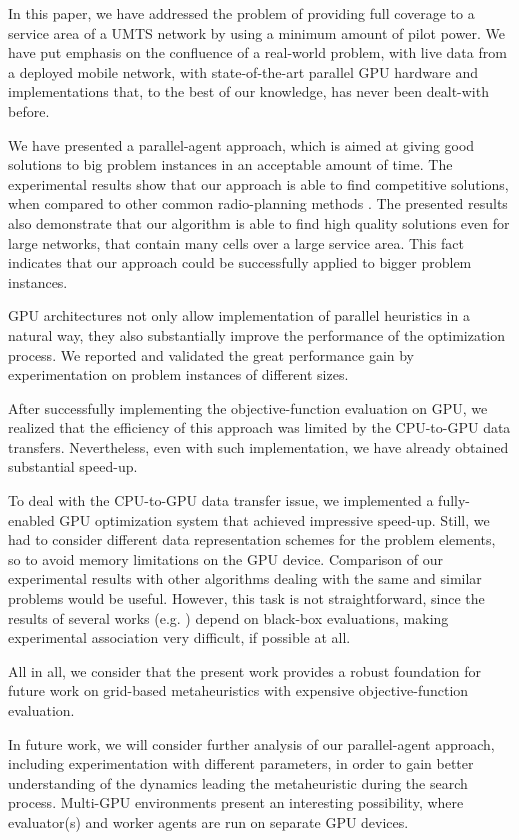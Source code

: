 In this paper, we have addressed the problem of providing full coverage
to a service area of a UMTS network by using a minimum amount of pilot
power. We have put emphasis on the confluence of a real-world problem,
with live data from a deployed mobile network, with state-of-the-art
parallel GPU hardware and implementations that, to the best of our
knowledge, has never been dealt-with before.

We have presented a parallel-agent approach, which is aimed at giving
good solutions to big problem instances in an acceptable amount of
time. The experimental results show that our approach is able to find
competitive solutions, when compared to other common radio-planning
methods \cite{Holma_WCDMA.for.UMTS:2005}. The presented results also
demonstrate that our algorithm is able to find high quality solutions
even for large networks, that contain many cells over a large service
area. This fact indicates that our approach could be successfully
applied to bigger problem instances.

GPU architectures not only allow implementation of parallel heuristics
in a natural way, they also substantially improve the performance
of the optimization process. We reported and validated the great performance
gain by experimentation on problem instances of different sizes.

After successfully implementing the objective-function evaluation
on GPU, we realized that the efficiency of this approach was limited
by the CPU-to-GPU data transfers. Nevertheless, even with such implementation,
we have already obtained substantial speed-up.

To deal with the CPU-to-GPU data transfer issue, we implemented a
fully-enabled GPU optimization system that achieved impressive speed-up.
Still, we had to consider different data representation schemes for
the problem elements, so to avoid memory limitations on the GPU device.
Comparison of our experimental results with other algorithms dealing
with the same and similar problems would be useful. However, this
task is not straightforward, since the results of several works (e.g.
\cite{Gerdenitsch_PhD:2004,Turke_Advanced.site.configuration.techniques:2005})
depend on black-box evaluations, making experimental association very
difficult, if possible at all. 

All in all, we consider that the present work provides a robust foundation
for future work on grid-based metaheuristics with expensive objective-function
evaluation.

In future work, we will consider further analysis of our parallel-agent
approach, including experimentation with different parameters, in
order to gain better understanding of the dynamics leading the metaheuristic
during the search process. Multi-GPU environments present an interesting
possibility, where evaluator(s) and worker agents are run on separate
GPU devices.
